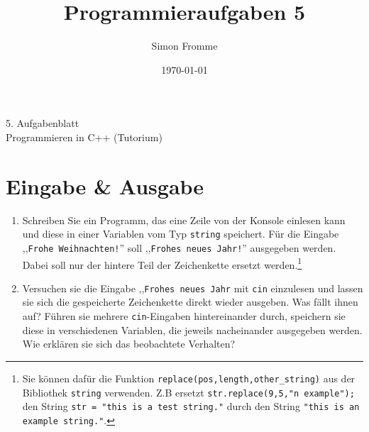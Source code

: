 \documentclass[paper=a4, fontsize=11pt, twoside]{scrartcl}
\title{Programmieraufgaben 5}
\author{Simon Fromme}
\date{\normalsize\today}
\begin{document}
\vspace*{0.75\baselineskip}
\begin{center}
  \Large 5. Aufgabenblatt \\\vspace{0.5em} \large Programmieren in C++ (Tutorium)
\end{center}

\section*{Eingabe \& Ausgabe}
\begin{enumerate}
\item Schreiben Sie ein Programm, das eine Zeile von der Konsole einlesen kann und diese in einer Variablen vom Typ \texttt{string} speichert. Für die Eingabe ,,\texttt{Frohe Weihnachten!}'' soll ,,\texttt{Frohes neues Jahr!}'' ausgegeben werden. Dabei soll nur der hintere Teil der Zeichenkette ersetzt werden.\footnote{Sie können dafür die Funktion \texttt{replace(pos,length,other_string)} aus der Bibliothek \texttt{string} verwenden. Z.B ersetzt \texttt{str.replace(9,5,"n example");} den String \texttt{str = "this is a test string."} durch den String \texttt{"this is an example string."}.  }
		\item Versuchen sie die Eingabe ,,\texttt{Frohes neues Jahr} mit \texttt{cin} einzulesen und lassen sie sich die gespeicherte Zeichenkette direkt wieder ausgeben. Was fällt ihnen auf? Führen sie mehrere \texttt{cin}-Eingaben hintereinander durch, speichern sie diese in verschiedenen Variablen, die jeweils nacheinander ausgegeben werden. Wie erklären sie sich das beobachtete Verhalten?
\end{enumerate}
\end{document}
